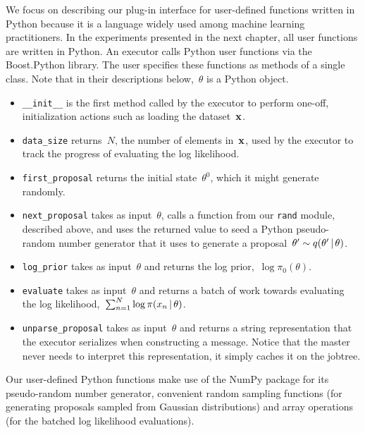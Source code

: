 \documentclass[angelino.tex]{subfiles}
\begin{document}
We focus on describing our plug-in interface for user-defined functions written
in Python because it is a language widely used among machine learning practitioners.
%
In the experiments presented in the next chapter,
all user functions are written in Python.
%
An executor calls Python user functions via the Boost.Python library.
%
The user specifies these functions as methods of a single class.
%
Note that in their descriptions below,~$\theta$ is a Python object.
%
\begin{itemize}
\item \texttt{\_\_init\_\_} is the first method called by the executor
to perform one-off, initialization actions such as loading the dataset~$\mathbf{x}$.
%
\item \texttt{data\_size} returns~$N$, the number of elements in~$\mathbf{x}$,
used by the executor to track the progress of evaluating the log likelihood.
%
\item \texttt{first\_proposal} returns the initial state~$\theta^0$,
which it might generate randomly.
%
\item \texttt{next\_proposal} takes as input~$\theta$,
calls a function from our \texttt{rand} module, described above,
and uses the returned value to seed a Python pseudo-random number generator
that it uses to generate a proposal~$\theta' \sim q(\theta' \,|\, \theta)$.
%
\item \texttt{log\_prior} takes as input~$\theta$ and returns the log prior,~$\log \pi_0(\theta)$.
%
\item \texttt{evaluate} takes as input~$\theta$ and returns a batch of work
towards evaluating the log likelihood,~$\sum_{n=1}^N \log \pi(x_n \,|\, \theta)$.
%
\item \texttt{unparse\_proposal} takes as input~$\theta$ and returns a string
representation that the executor serializes when constructing a \SETPROPOSAL message.
Notice that the master never needs to interpret this representation,
it simply caches it on the jobtree.
%
\end{itemize}
%
Our user-defined Python functions make use of the
NumPy package for its pseudo-random number generator,
convenient random sampling functions
(\eg for generating proposals sampled from Gaussian distributions)
and array operations (\eg for the batched log likelihood evaluations).
\end{document}
